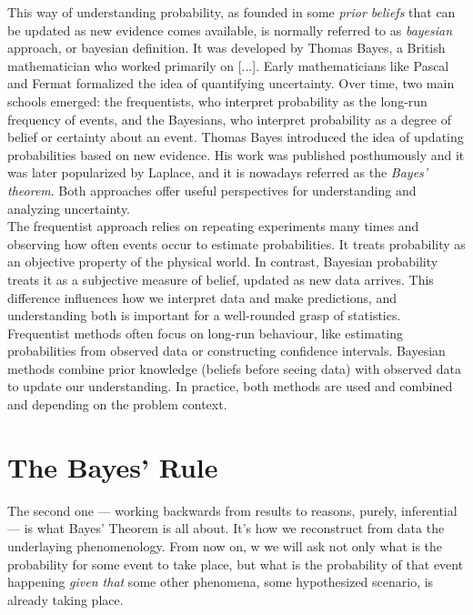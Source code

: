 \documentclass{book}
\begin{document}
This way of understanding probability, as founded in some \textit{prior beliefs} that can be updated as new evidence comes available, is normally referred to as \textit{bayesian} approach, or bayesian definition. It was developed by Thomas Bayes, a British mathematician who worked primarily on [...]. Early mathematicians like Pascal and Fermat formalized the idea of quantifying uncertainty. Over time, two main schools emerged: the frequentists, who interpret probability as the long-run frequency of events, and the Bayesians, who interpret probability as a degree of belief or certainty about an event. Thomas Bayes introduced the idea of updating probabilities based on new evidence. His work was published posthumously and it was later popularized by Laplace, and it is nowadays referred as the \textit{Bayes’ theorem}. Both approaches offer useful perspectives for understanding and analyzing uncertainty.\\

The frequentist approach relies on repeating experiments many times and observing how often events occur to estimate probabilities. It treats probability as an objective property of the physical world. In contrast, Bayesian probability treats it as a subjective measure of belief, updated as new data arrives. This difference influences how we interpret data and make predictions, and understanding both is important for a well-rounded grasp of statistics.\\

Frequentist methods often focus on long-run behaviour, like estimating probabilities from observed data or constructing confidence intervals. Bayesian methods combine prior knowledge (beliefs before seeing data) with observed data to update our understanding. In practice, both methods are used and combined and depending on the problem context.\\

\newpage

\section{The Bayes' Rule}

The second one — working backwards from results to reasons, purely, inferential — is what Bayes’ Theorem is all about. It’s how we reconstruct from data the underlaying phenomenology. From now on, w we will ask not only what is the probability for some event to take place, but what is the probability of that event happening \textit{given that} some other phenomena, some hypothesized scenario, is already taking place.\\
\end{document}
